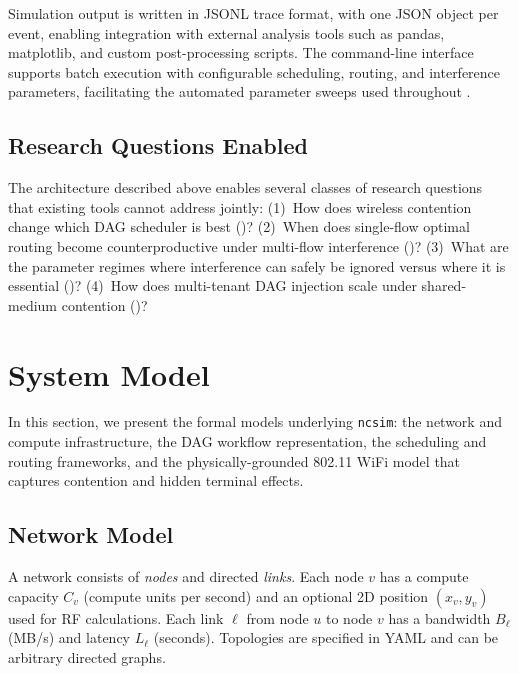\documentclass[conference]{IEEEtran}
\newcommand{\ncsim}{\texttt{ncsim}}
\begin{document}
\noindent Simulation output is written in JSONL trace format, with one JSON object
per event, enabling integration with external analysis tools such as
pandas, matplotlib, and custom post-processing scripts.  The command-line
interface supports batch execution with configurable scheduling, routing,
and interference parameters, facilitating the automated parameter sweeps
used throughout .


\subsection{Research Questions Enabled}
\label{sec:research_questions}

The architecture described above enables several classes of research
questions that existing tools cannot address jointly:
(1)~How does wireless contention change which DAG scheduler is best
()?
(2)~When does single-flow optimal routing become counterproductive under
multi-flow interference ()?
(3)~What are the parameter regimes where interference can safely be
ignored versus where it is essential ()?
(4)~How does multi-tenant DAG injection scale under shared-medium
contention ()?


\section{System Model}
\label{sec:model}

In this section, we present the formal models underlying \ncsim{}: the
network and compute infrastructure, the DAG workflow representation,
the scheduling and routing frameworks, and the physically-grounded
802.11 WiFi model that captures contention and hidden terminal effects.

\subsection{Network Model}

A network consists of \emph{nodes} and directed \emph{links}.  Each node $v$
has a compute capacity $C_v$ (compute units per second) and an optional 2D
position $(x_v, y_v)$ used for RF calculations.  Each link $\ell$ from node
$u$ to node $v$ has a bandwidth $B_\ell$ (MB/s) and latency $L_\ell$
(seconds).  Topologies are specified in YAML and can be arbitrary directed
graphs.
\end{document}
